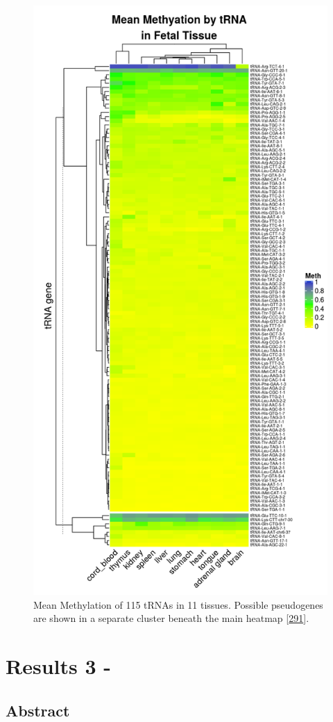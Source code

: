 \documentclass[
]{book}
\begin{document}
\begin{figure}

{\centering \includegraphics[width=0.6\linewidth]{./figs/meanMethBytRNAByFetalTissueHeatmapPseudosplit} 

}

\caption{Mean Methylation of 115 tRNAs in 11 tissues. Possible pseudogenes are shown in a separate cluster beneath the main heatmap {[}\protect\hyperlink{ref-Gu2016}{291}{]}.}\label{fig:meanMethBytRNAByFetalTissueHeatmap}
\end{figure}



\hypertarget{Alus}{%
\chapter{Results 3 -}\label{Alus}}

\hypertarget{abstract-3}{%
\section{Abstract}\label{abstract-3}}
\end{document}
